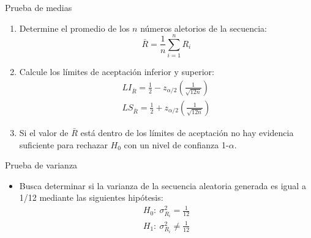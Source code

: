 \begin{frame}{Prueba de medias}
    \begin{enumerate}
        \item Determine el promedio de los $n$ números aletorios de la secuencia: 
        \begin{equation*}
            \bar{R}=\frac{1}{n} \sum_{i=1}^{n}{R_i}
        \end{equation*}
        \item Calcule los límites de aceptación inferior y superior: 
                \begin{eqnarray*}
                    LI_{\bar{R}}=\frac{1}{2}-z_{\alpha/2}\left(\frac{1}{\sqrt{12n}}\right)\\
                    LS_{\bar{R}}=\frac{1}{2}+z_{\alpha/2}\left(\frac{1}{\sqrt{12n}}\right)
                \end{eqnarray*}
        \item Si el valor de $\bar{R}$ está dentro de los límites de aceptación no hay evidencia suficiente para rechazar $H_0$ con un nivel de confianza 1-$\alpha$. 
    \end{enumerate}
\end{frame}

\begin{frame}{Prueba de varianza}
    \begin{itemize}
        \item Busca determinar si la varianza de la secuencia aleatoria generada es igual a 1/12 mediante las siguientes hipótesis:
            \begin{eqnarray*}
                H_0:~\sigma^2_{R_i} = \frac{1}{12}\\
                H_1:~\sigma^2_{R_i} \neq \frac{1}{12}
            \end{eqnarray*}        
    \end{itemize} 
\end{frame}


